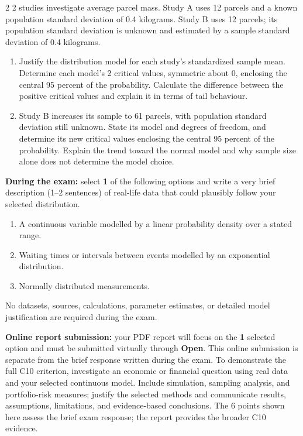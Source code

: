 \begin{multicols}{2}
2 studies investigate average parcel mass. Study A uses 12 parcels and a known population standard deviation of 0.4 kilograms. Study B uses 12 parcels; its population standard deviation is unknown and estimated by a sample standard deviation of 0.4 kilograms.
\begin{enumerate}[label=\textbf{(\alph*)},leftmargin=*]
\item Justify the distribution model for each study's standardized sample mean. Determine each model's 2 critical values, symmetric about 0, enclosing the central 95 percent of the probability. Calculate the difference between the positive critical values and explain it in terms of tail behaviour. 
\item Study B increases its sample to 61 parcels, with population standard deviation still unknown. State its model and degrees of freedom, and determine its new critical values enclosing the central 95 percent of the probability. Explain the trend toward the normal model and why sample size alone does not determine the model choice. 
\end{enumerate}

\textbf{During the exam:} select \textbf{1} of the following options and write a very brief description (1--2 sentences) of real-life data that could plausibly follow your selected distribution. 
\begin{enumerate}[label=\textbf{(\alph*)},leftmargin=*]
\item A continuous variable modelled by a linear probability density over a stated range.
\item Waiting times or intervals between events modelled by an exponential distribution.
\item Normally distributed measurements.
\end{enumerate}
No datasets, sources, calculations, parameter estimates, or detailed model justification are required during the exam.

\textbf{Online report submission:} your PDF report will focus on the \textbf{1} selected option and must be submitted virtually through \textbf{Open}. This online submission is separate from the brief response written during the exam. To demonstrate the full C10 criterion, investigate an economic or financial question using real data and your selected continuous model. Include simulation, sampling analysis, and portfolio-risk measures; justify the selected methods and communicate results, assumptions, limitations, and evidence-based conclusions. The 6 points shown here assess the brief exam response; the report provides the broader C10 evidence.
\end{multicols}




